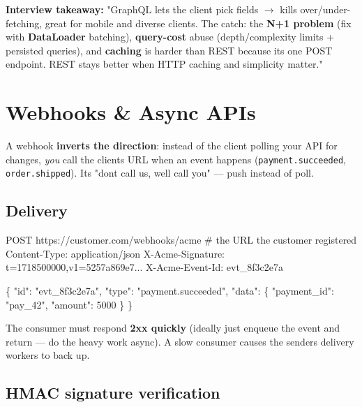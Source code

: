 \documentclass[11pt]{article}
\newenvironment{Shaded}{\begin{snugshade}}{\end{snugshade}}
\newcommand{\NormalTok}[1]{\textcolor[rgb]{0.81,0.81,0.76}{#1}}
\begin{document}
\textbf{Interview takeaway:} "GraphQL lets the client pick fields \(\rightarrow\) kills over/under-fetching, great for mobile and diverse clients. The catch: the \textbf{N+1 problem} (fix with \textbf{DataLoader} batching), \textbf{query-cost} abuse (depth/complexity limits + persisted queries), and \textbf{caching} is harder than REST because it\textquotesingle s one POST endpoint. REST stays better when HTTP caching and simplicity matter."

\section{Webhooks \& Async APIs}\label{webhooks--async-apis}

A webhook \textbf{inverts the direction}: instead of the client polling your API for changes, \emph{you} call the client\textquotesingle s URL when an event happens (\texttt{payment.succeeded}, \texttt{order.shipped}). It\textquotesingle s "don\textquotesingle t call us, we\textquotesingle ll call you" --- push instead of poll.

\subsection{Delivery}\label{delivery}


\begin{Shaded}
\begin{Highlighting}[]
\NormalTok{POST https://customer.com/webhooks/acme    \# the URL the customer registered}
\NormalTok{Content{-}Type: application/json}
\NormalTok{X{-}Acme{-}Signature: t=1718500000,v1=5257a869e7...}
\NormalTok{X{-}Acme{-}Event{-}Id: evt\_8f3c2e7a}

\NormalTok{\{ "id": "evt\_8f3c2e7a", "type": "payment.succeeded",}
\NormalTok{  "data": \{ "payment\_id": "pay\_42", "amount": 5000 \} \}}
\end{Highlighting}
\end{Shaded}

The consumer must respond \textbf{2xx quickly} (ideally just enqueue the event and return --- do the heavy work async). A slow consumer causes the sender\textquotesingle s delivery workers to back up.

\subsection{HMAC signature verification}\label{hmac-signature-verification}
\end{document}
